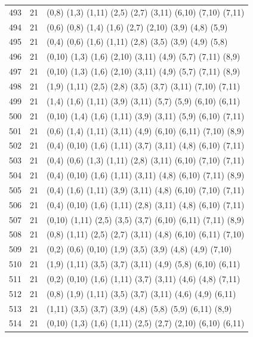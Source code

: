 \begin{appendix}
{\begin{longtable}{lll}
493& 21 & (0,8)   (1,3)  (1,11) (2,5)   (2,7)   (3,11)  (6,10)  (7,10)  (7,11)\\
494& 21 & (0,6)   (0,8)  (1,4)  (1,6)   (2,7)   (2,10)  (3,9)   (4,8)   (5,9)\\
495& 21 & (0,4)   (0,6)  (1,6)  (1,11)  (2,8)   (3,5)   (3,9)   (4,9)   (5,8)\\
496& 21 & (0,10)  (1,3)  (1,6)  (2,10)  (3,11)  (4,9)   (5,7)   (7,11)  (8,9)\\
497& 21 & (0,10)  (1,3)  (1,6)  (2,10)  (3,11)  (4,9)   (5,7)   (7,11)  (8,9)\\
498& 21 & (1,9)   (1,11) (2,5)  (2,8)   (3,5)   (3,7)   (3,11)  (7,10)  (7,11)\\
499& 21 & (1,4)   (1,6)  (1,11) (3,9)   (3,11)  (5,7)   (5,9)   (6,10)  (6,11)\\
500& 21 & (0,10)  (1,4)  (1,6)  (1,11)  (3,9)   (3,11)  (5,9)   (6,10)  (7,11)\\
501& 21 & (0,6)   (1,4)  (1,11) (3,11)  (4,9)   (6,10)  (6,11)  (7,10)  (8,9)\\
502& 21 & (0,4)   (0,10) (1,6)  (1,11)  (3,7)   (3,11)  (4,8)   (6,10)  (7,11)\\
503& 21 & (0,4)   (0,6)  (1,3)  (1,11)  (2,8)   (3,11)  (6,10)  (7,10)  (7,11)\\
504& 21 & (0,4)   (0,10) (1,6)  (1,11)  (3,11)  (4,8)   (6,10)  (7,11)  (8,9)\\
505& 21 & (0,4)   (1,6)  (1,11) (3,9)   (3,11)  (4,8)   (6,10)  (7,10)  (7,11)\\
506& 21 & (0,4)   (0,10) (1,6)  (1,11)  (2,8)   (3,11)  (4,8)   (6,10)  (7,11)\\
507& 21 & (0,10)  (1,11) (2,5)  (3,5)   (3,7)   (6,10)  (6,11)  (7,11)  (8,9)\\
508& 21 & (0,8)   (1,11) (2,5)  (2,7)   (3,11)  (4,8)   (6,10)  (6,11)  (7,10)\\
509& 21 & (0,2)   (0,6)  (0,10) (1,9)   (3,5)   (3,9)   (4,8)   (4,9)   (7,10)\\
510& 21 & (1,9)   (1,11) (3,5)  (3,7)   (3,11)  (4,9)   (5,8)   (6,10)  (6,11)\\
511& 21 & (0,2)   (0,10) (1,6)  (1,11)  (3,7)   (3,11)  (4,6)   (4,8)   (7,11)\\
512& 21 & (0,8)   (1,9)  (1,11) (3,5)   (3,7)   (3,11)  (4,6)   (4,9)   (6,11)\\
513& 21 & (1,11)  (3,5)  (3,7)  (3,9)   (4,8)   (5,8)   (5,9)   (6,11)  (8,9)\\
514& 21 & (0,10)  (1,3)  (1,6)  (1,11)  (2,5)   (2,7)   (2,10)  (6,10)  (6,11)\\

\end{longtable}}
\end{appendix}
